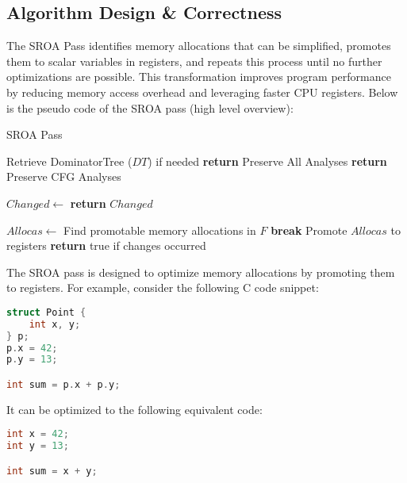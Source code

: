 \documentclass[conference]{IEEEtran}
\begin{document}
\subsection{Algorithm Design \& Correctness}
The SROA Pass identifies memory allocations that can be simplified, promotes them to scalar variables in registers, and repeats this process until no further optimizations are possible. This transformation improves program performance by reducing memory access overhead and leveraging faster CPU registers. Below is the pseudo code of the SROA pass (high level overview):
\begin{algorithm}[H]
	\caption{SROA Pass}
	\begin{algorithmic}[1]
		\State Retrieve DominatorTree ($DT$) if needed
		\State \textbf{return} Preserve All Analyses
		\EndIf
		\State \textbf{return} Preserve CFG Analyses
		\EndFunction

		\State $Changed \gets$ 
		\State \textbf{return} $Changed$
		\EndFunction

		\Repeat
		\State $Allocas \gets$ Find promotable memory allocations in $F$
		\State \textbf{break}
		\EndIf
		\State Promote $Allocas$ to registers
		\State \textbf{return} true if changes occurred
		\EndFunction
	\end{algorithmic}
\end{algorithm}

The SROA pass is designed to optimize memory allocations by promoting them to registers. For example, consider the following C code snippet:

\begin{lstlisting}[language=C, frame=single, showstringspaces=false]
struct Point {
    int x, y;
} p;
p.x = 42;
p.y = 13;

int sum = p.x + p.y;
\end{lstlisting}

It can be optimized to the following equivalent code:

\begin{lstlisting}[language=C, frame=single, showstringspaces=false]
int x = 42;
int y = 13;

int sum = x + y;
\end{lstlisting}
\end{document}
